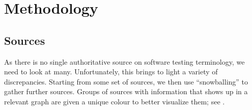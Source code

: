 \section{Methodology}
\label{method}

\subsection{Sources}
\label{sources}
As there is no single authoritative source on software testing terminology,
we need to look at many. Unfortunately, this brings to light a variety of
discrepancies. Starting from some set of sources, we then use
``snowballing'' %
to gather further sources. Groups of sources with
information that shows up in a relevant graph are given a unique colour to
better visualize them; see .

